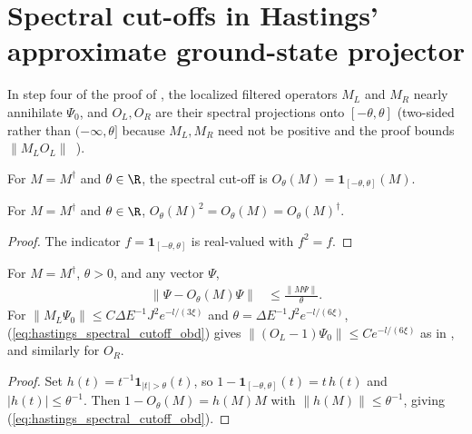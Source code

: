 \section{Spectral cut-offs in Hastings' approximate ground-state projector}
\label{sec:hastings_spectral_cutoff}


In step four of the proof of \cite[Lemma~1]{Hastings2007AreaLaw}, the localized
filtered operators $M_L$ and $M_R$ nearly annihilate $\Psi_0$, and $O_L,O_R$
are their spectral projections onto $[-\theta,\theta]$ (two-sided rather than
$(-\infty,\theta]$ because $M_L,M_R$ need not be positive and the proof bounds
$\|M_LO_L\|$~\cite{gap:hastings07_spectral_cutoff_threshold}).

\begin{definition}
    \label{def:hastings_spectral_cutoff}
    \leanok
    For $M=M^\dagger$ and $\theta\in\R$, the spectral cut-off is
    $O_\theta(M)=\mathbf 1_{[-\theta,\theta]}(M)$.
\end{definition}

\begin{lemma}
    \label{thm:hastings_spectral_cutoff_projection}
    \leanok
    For $M=M^\dagger$ and $\theta\in\R$, $O_\theta(M)^2=O_\theta(M)=O_\theta(M)^\dagger$.
\end{lemma}
\begin{proof}\leanok
    The indicator $f=\mathbf 1_{[-\theta,\theta]}$ is real-valued with $f^2=f$.
\end{proof}

\begin{lemma}
    \label{thm:hastings_spectral_cutoff_obd}
    \leanok
    For $M=M^\dagger$, $\theta>0$, and any vector $\Psi$,
    \begin{align}
        \lVert\Psi-O_\theta(M)\Psi\rVert
         & \le\frac{\lVert M\Psi\rVert}{\theta}.
        \label{eq:hastings_spectral_cutoff_obd}
    \end{align}
    For $\lVert M_L\Psi_0\rVert\le C\Delta E^{-1}J^2e^{-l/(3\xi)}$ and
    $\theta=\Delta E^{-1}J^2e^{-l/(6\xi)}$, (\ref{eq:hastings_spectral_cutoff_obd})
    gives $\lVert(O_L-1)\Psi_0\rVert\le Ce^{-l/(6\xi)}$ as in
    \cite[eq.~(obd)]{Hastings2007AreaLaw}, and similarly for $O_R$.
\end{lemma}
\begin{proof}\leanok
    Set $h(t)=t^{-1}\mathbf 1_{\lvert t\rvert>\theta}(t)$, so
    $1-\mathbf 1_{[-\theta,\theta]}(t)=t\,h(t)$ and $\lvert h(t)\rvert\le\theta^{-1}$.
    Then $1-O_\theta(M)=h(M)M$ with $\lVert h(M)\rVert\le\theta^{-1}$, giving
    (\ref{eq:hastings_spectral_cutoff_obd}).
\end{proof}

